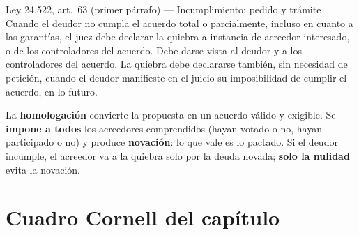 \documentclass[12pt,oneside]{book}
\begin{document}
\begin{norma}{Ley 24.522, art.\ 63 (primer párrafo) --- Incumplimiento: pedido y trámite}
Cuando el deudor no cumpla el acuerdo total o parcialmente, incluso en cuanto a las garantías, el juez debe declarar la quiebra a instancia de acreedor interesado, o de los controladores del acuerdo. Debe darse vista al deudor y a los controladores del acuerdo. La quiebra debe declararse también, sin necesidad de petición, cuando el deudor manifieste en el juicio su imposibilidad de cumplir el acuerdo, en lo futuro.
\end{norma}

\begin{important}
La \textbf{homologación} convierte la propuesta en un acuerdo válido y exigible. Se \textbf{impone a todos} los acreedores comprendidos (hayan votado o no, hayan participado o no) y produce \textbf{novación}: lo que vale es lo pactado. Si el deudor incumple, el acreedor va a la quiebra solo por la deuda novada; \textbf{solo la nulidad} evita la novación.
\end{important}

\section{Cuadro Cornell del capítulo}
\end{document}
